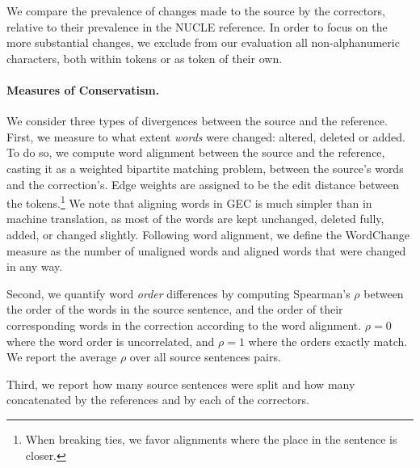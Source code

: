 \documentclass[letter,11pt]{article}
\newcommand{\oa}[1]{\footnote{\color{red}OA: #1}}
\begin{document}
We compare the prevalence of changes made to the source by the correctors,
relative to their prevalence in the NUCLE reference.
In order to focus on the more substantial changes, we exclude from our evaluation
all non-alphanumeric characters, both within tokens or as token of their own.



\paragraph{Measures of Conservatism.}
We consider three types of divergences between the source and the reference.
First, we measure to what extent \emph{words} were changed: altered, deleted or added.
To do so, we compute word alignment between the source and the reference, casting it
as a weighted bipartite matching problem, between the source's words and the correction's. 
Edge weights are assigned to be the edit distance
between the tokens.\footnote{When breaking ties, we favor alignments where the place in the sentence is closer.}
We note that aligning words in GEC is much simpler than in machine translation,
as most of the words are kept unchanged, deleted fully, added, or changed slightly.
Following word alignment, we define the {\sc WordChange} measure
as the number of unaligned words and aligned words that were changed in any way.

Second, we quantify word \emph{order} differences by computing
Spearman's $\rho$ between the order of the words in the source sentence,
and the order of their corresponding words in the correction according to the word alignment.
$\rho=0$ where the word order is uncorrelated, and $\rho=1$ where the orders
exactly match. We report the average $\rho$ over all source sentences pairs. 

Third, we report how many source sentences were split and how many
concatenated by the references and by each of the correctors.
\end{document}
